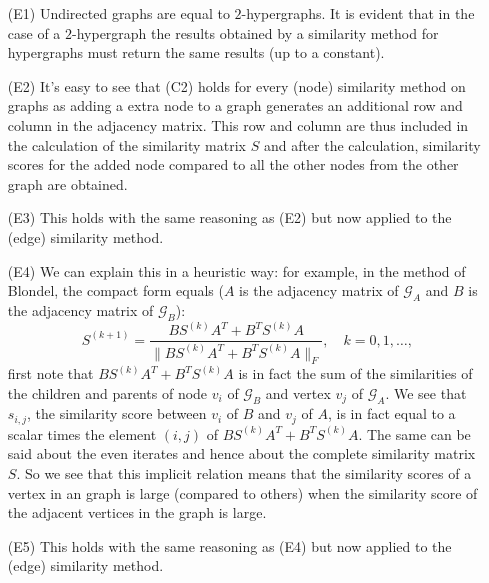 \documentclass[a4paper,11pt]{report}
\newcommand{\graf}{\mathscr{G}}
\begin{document}
\begin{itemize}
  \item[(E1)] Undirected graphs are equal to $2$-hypergraphs. It is evident that 
  in the case of a $2$-hypergraph the results obtained by a similarity method 
  for hypergraphs must return the same results (up to a constant).
   \item[(E2)] It's easy to see that (C2) holds for every (node) similarity method on 
   graphs as adding a extra node to a graph generates an additional row and 
   column in the adjacency matrix. This row and column are thus included in the 
   calculation of the similarity matrix $S$ and after the calculation, similarity 
   scores for the added node compared to all the other nodes from the other graph are 
   obtained.
  \item[(E3)] This holds with the same reasoning as (E2) but now applied to the (edge) similarity method.
  \item[(E4)] We can explain this in a heuristic way: for example, in the method 
  of Blondel, the compact form equals ($A$ is the adjacency matrix of $\graf_A$ and $B$ is the adjacency
  matrix of $\graf_B$):
  $$S^{(k+1)} = \frac{BS^{(k)}A^T + B^TS^{(k)}A}{\|BS^{(k)}A^T + B^TS^{(k)}A\|_F},\quad 
  k=0,1,\ldots,$$
first note that $BS^{(k)}A^T + B^TS^{(k)}A$ is in fact the sum of the 
similarities of the children and parents of node $v_i$ of $\graf_B$ and vertex $v_j$ 
of $\graf_A$. We see that $s_{i,j}$, the similarity score between $v_i$ of $B$ and $v_j$ of $A$, is in fact
 equal to a scalar times the element $(i,j)$ of $BS^{(k)}A^T + B^TS^{(k)}A$. The same can be said about the even iterates and hence about
 the complete similarity matrix $S$. So we see that this implicit relation means that the similarity scores
 of a vertex in an graph is large (compared to others) when the similarity score 
  of the adjacent vertices in the graph is large.
  \item[(E5)] This holds with the same reasoning as (E4) but now applied to the (edge) similarity method. 
  


\end{itemize}
\end{document}
